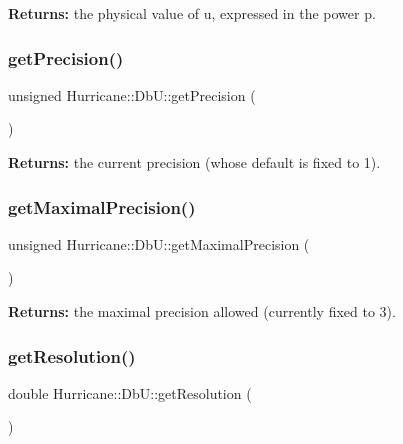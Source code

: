 {\bfseries Returns\+:} the physical value of {\ttfamily u}, expressed in the power {\ttfamily p}. \mbox{\label{group__DbUGroup_ga6169efbdd9b3d54a0bd8467c8f957fda}} 
\subsubsection{\texorpdfstring{get\+Precision()}{getPrecision()}}
{\footnotesize\ttfamily unsigned Hurricane\+::\+Db\+U\+::get\+Precision (\begin{DoxyParamCaption}{ }\end{DoxyParamCaption})\hspace{0.3cm}{\ttfamily [static]}}

{\bfseries Returns\+:} the current precision (whose default is fixed to 1). \mbox{\label{group__DbUGroup_ga8756c9f0a32af5f601cd150e73b02c03}} 
\subsubsection{\texorpdfstring{get\+Maximal\+Precision()}{getMaximalPrecision()}}
{\footnotesize\ttfamily unsigned Hurricane\+::\+Db\+U\+::get\+Maximal\+Precision (\begin{DoxyParamCaption}{ }\end{DoxyParamCaption})\hspace{0.3cm}{\ttfamily [static]}}

{\bfseries Returns\+:} the maximal precision allowed (currently fixed to 3). \mbox{\label{group__DbUGroup_ga120a60b09b344d01c583567a1e489d9e}} 
\subsubsection{\texorpdfstring{get\+Resolution()}{getResolution()}}
{\footnotesize\ttfamily double Hurricane\+::\+Db\+U\+::get\+Resolution (\begin{DoxyParamCaption}{ }\end{DoxyParamCaption})\hspace{0.3cm}{\ttfamily [static]}}

